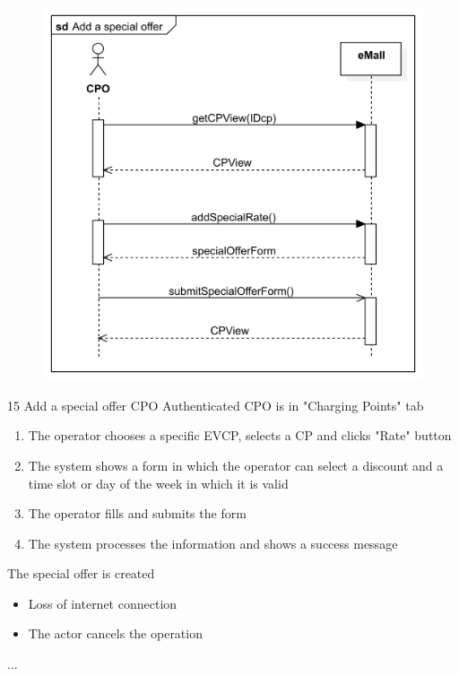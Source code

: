 \pagebreak
\usecase
{
    \begin{figure}[H]
        \centering
        \includegraphics[scale=0.9]{src/sequence_diagram/specialOffer.png}
    \end{figure}
}
{15}
{Add a special offer} %
{CPO} %
{Authenticated CPO is in "Charging Points" tab} %
{ %
    \begin{enumerate}
        \item The operator chooses a specific EVCP, selects a CP and clicks "Rate" button
        \item The system shows a form in which the operator can select a discount and a time slot or day of the week in which it is valid
        \item The operator fills and submits the form
        \item The system processes the information and shows a success message
    \end{enumerate}
}
{The special offer is created} %
{ %
    \begin{itemize}
        \item Loss of internet connection
        \item The actor cancels the operation
    \end{itemize}
}
{ %
    ...
}


